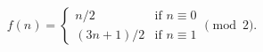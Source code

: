 

$$
f(n) =
    \begin{cases}
    n/2 &\mbox{if } n \equiv 0 \\ 
    (3n +1)/2 & \mbox{if } n \equiv 1
\end{cases} \pmod{2}.
$$